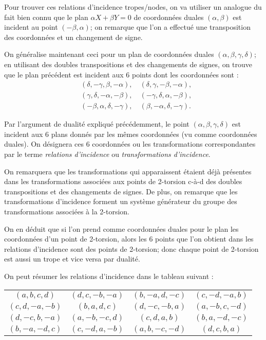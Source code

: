 \documentclass[a4paper]{article}
\theoremstyle{definition}
\theoremstyle{remark}
\numberwithin{equation}{section}
\begin{document}
Pour trouver ces relations d'incidence tropes/nodes, on va utiliser un analogue du fait bien connu que le plan $\alpha X + \beta Y=0$ de coordonnées duales $(\alpha,\beta)$ est incident au point $(-\beta, \alpha)$; on remarque que l'on a effectué une transposition des coordonnées et un changement de signe.

On généralise maintenant ceci pour un plan de coordonnées duales $(\alpha, \beta, \gamma, \delta)$; en utilisant des doubles transpositions et des changements de signes, on trouve que le plan précédent est incident aux 6 points dont les coordonnées sont :
\begin{align*}
   &(\delta, -\gamma, \beta, -\alpha), \quad (\delta, \gamma, -\beta, -\alpha), \\
   &(\gamma, \delta, -\alpha, -\beta), \quad (-\gamma, \delta, \alpha, -\beta), \\
   &(-\beta, \alpha, \delta, -\gamma), \quad (\beta, -\alpha, \delta, -\gamma).
\end{align*}

Par l'argument de dualité expliqué précédemment, le point $(\alpha, \beta, \gamma, \delta)$ est incident aux 6 plans donnés par les mêmes coordonnées (vu comme coordonnées duales).
On désignera ces 6 coordonnées ou les transformations correspondantes par le terme \emph{relations d'incidence} ou \emph{transformations d'incidence}.

On remarquera que les transformations qui apparaissent étaient déjà présentes dans les transformations associées aux points de 2-torsion c-à-d des doubles transpositions et des changements de signes. De plus, on remarque que les transformations d'incidence forment un système générateur du groupe des transformations associées à la 2-torsion.

On en déduit que si l'on prend comme coordonnées duales pour le plan les coordonnées d'un point de 2-torsion, alors les 6 points que l'on obtient dans les relations d'incidence sont des points de 2-torsion; donc chaque point de 2-torsion est aussi un trope et vice versa par dualité.

On peut résumer les relations d'incidence dans le tableau suivant :
\begin{center}
\begin{tabular}{ c c c c }
   $(a,b,c,d)$   & $(d,c,-b,-a)$ & $(b,-a,d,-c)$ & $(c,-d,-a,b)$ \\
   $(c,d,-a,-b)$ & $(b,a,d,c)$ & $(d,-c,-b,a)$ & $(a,-b,c,-d)$ \\
   $(d,-c,b,-a)$ & $(a,-b,-c,d)$ & $(c,d,a,b)$ & $(b,a,-d,-c)$ \\
   $(b,-a,-d,c)$ &  $(c,-d,a,-b)$ & $(a,b,-c,-d)$ & $(d, c, b, a)$
 \end{tabular}
\end{center}
\end{document}
